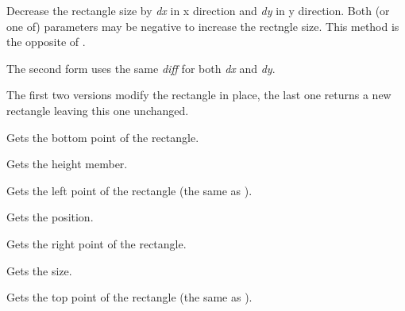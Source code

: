 

Decrease the rectangle size by {\it dx} in x direction and {\it dy} in y
direction. Both (or one of) parameters may be negative to increase the
rectngle size. This method is the opposite of .

The second form uses the same {\it diff} for both {\it dx} and {\it dy}.

The first two versions modify the rectangle in place, the last one returns a
new rectangle leaving this one unchanged.



\label{wxrectgetbottom}


Gets the bottom point of the rectangle.

\label{wxrectgetheight}


Gets the height member.

\label{wxrectgetleft}


Gets the left point of the rectangle (the same as ).

\label{wxrectgetposition}


Gets the position.

\label{wxrectgetright}


Gets the right point of the rectangle.

\label{wxrectgetsize}


Gets the size.

\label{wxrectgettop}


Gets the top point of the rectangle (the same as ).

